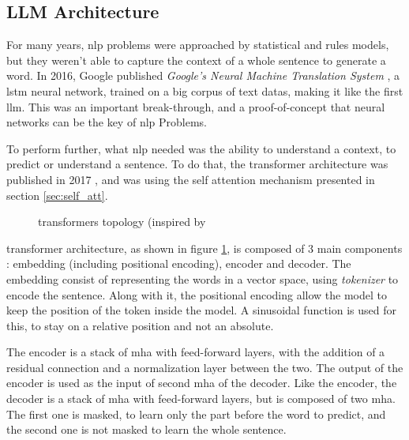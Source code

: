 
\subsection{LLM Architecture}
\label{sec:llm_arch}
For many years, \acrshort{nlp} problems were approached by statistical and rules models, but they weren't able to capture the context of a whole sentence to generate a word. In 2016, Google published \textit{Google's Neural Machine Translation System} \cite{wu_googles_2016}, a \acrfull{lstm} neural network, trained on a big corpus of text datas, making it like the first \acrlong{llm}. This was an important break-through, and a proof-of-concept that neural networks can be the key of \acrshort{nlp} Problems.

To perform further, what \acrshort{nlp} needed was the ability to understand a context, to predict or understand a sentence. To do that, the \Gls{transformer} architecture was published in 2017 \cite{vaswani_attention_2017}, and was using the self attention mechanism presented in section \ref{sec:self_att}. 

\begin{figure}[h]
    \centering
    
    \caption{\Glspl{transformer} topology (inspired by \cite{vaswani_attention_2017}}
    \label{fig:transformers}
\end{figure}

\Gls{transformer} architecture, as shown in figure \ref{fig:transformers}, is composed of 3 main components : embedding (including positional encoding), encoder and decoder. The embedding consist of representing the words in a vector space, using \textit{tokenizer} to encode the sentence.  Along with it, the positional encoding allow the model to keep the position of the token inside the model. A sinusoidal function is used for this, to stay on a relative position and not an absolute.

The encoder is a stack of \acrshort{mha} with feed-forward layers, with the addition of a residual connection and a normalization layer between the two. The output of the encoder is used as the input of second \acrshort{mha} of the decoder. Like the encoder, the decoder is a stack of \acrshort{mha} with feed-forward layers, but is composed of two \acrshort{mha}. The first one is masked, to learn only the part before the word to predict, and the second one is not masked to learn the whole sentence.


